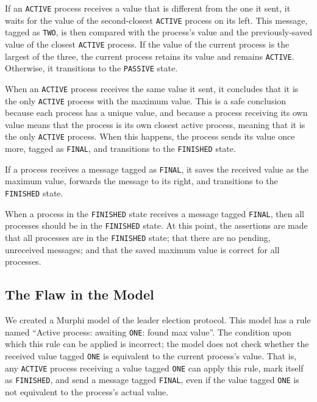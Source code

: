 If an \texttt{ACTIVE} process receives a value that is different from the one
it sent, it waits for the value of the second-closest \texttt{ACTIVE} process
on its left.
This message, tagged as \texttt{TWO}, is then compared with the process's value
and the previously-saved value of the closest \texttt{ACTIVE} process.
If the value of the current process is the largest of the three,
the current process retains its value and remains \texttt{ACTIVE}.
Otherwise, it transitions to the \texttt{PASSIVE} state.

When an \texttt{ACTIVE} process receives the same value it sent,
it concludes that it is the only \texttt{ACTIVE} process with the maximum value.
This is a safe conclusion because each process has a unique value, and because
a process receiving its own value means that the process is its own closest
active process, meaning that it is the only \texttt{ACTIVE} process.
When this happens, the process sends its value once more,
tagged as \texttt{FINAL}, and transitions to the \texttt{FINISHED} state.

If a process receives a message tagged as \texttt{FINAL}, it saves the
received value as the maximum value, forwards the message to its right,
and transitions to the \texttt{FINISHED} state.

When a process in the \texttt{FINISHED} state receives a message tagged
\texttt{FINAL}, then all processes should be in the \texttt{FINISHED} state.
At this point, the assertions are made
that all processes are in the \texttt{FINISHED} state;
that there are no pending, unreceived messages;
and that the saved maximum value is correct for all processes.

\subsection{The Flaw in the Model}\label{subsec:the-flaw-in-the-model}

We created a Murphi model of the leader election protocol.
This model has a rule named
``Active process: awaiting \texttt{ONE}: found max value''.
The condition upon which this rule can be applied is incorrect;
the model does not check whether the received value tagged \texttt{ONE} is
equivalent to the current process's value.
That is, any \texttt{ACTIVE} process receiving a value tagged \texttt{ONE}
can apply this rule, mark itself as \texttt{FINISHED}, and send a message
tagged \texttt{FINAL}, even if the value tagged \texttt{ONE} is not
equivalent to the process's actual value.

